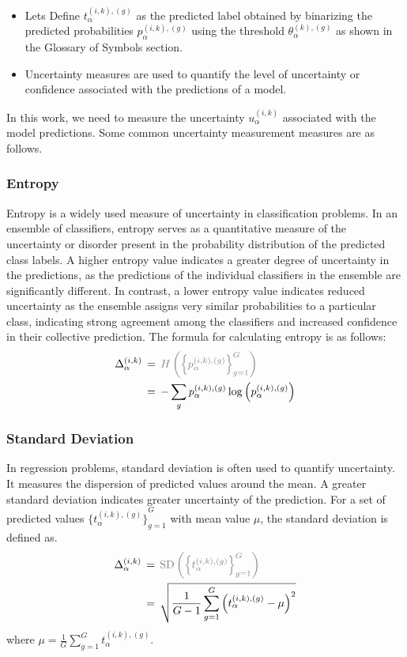 \documentclass[default]{bst/sn-jnl_mine}%
\begin{document}
\begin{itemize}
\begin{enumerate}
    \end{enumerate}
    \item Lets Define $t_{\alpha}^{(i,k),(g)} $ as the predicted label obtained by binarizing the predicted probabilities $p_{\alpha}^{ (i,k),(g)} $ using the threshold $\theta_{\alpha}^{(k),(g)} $ as shown in the Glossary of Symbols section.
    \item Uncertainty measures are used to quantify the level of uncertainty or confidence associated with the predictions of a model.
\end{itemize}
In this work, we need to measure the uncertainty $u_{\alpha}^{(i,k)}$ associated with the model predictions. Some common uncertainty measurement measures are as follows.
\subsubsection{Entropy}
Entropy is a widely used measure of uncertainty in classification problems. In an ensemble of classifiers, entropy serves as a quantitative measure of the uncertainty or disorder present in the probability distribution of the predicted class labels. A higher entropy value indicates a greater degree of uncertainty in the predictions, as the predictions of the individual classifiers in the ensemble are significantly different. In contrast, a lower entropy value indicates reduced uncertainty as the ensemble assigns very similar probabilities to a particular class, indicating strong agreement among the classifiers and increased confidence in their collective prediction. The formula for calculating entropy is as follows:
\begin{align}
    \Delta_{\alpha}^{(i,k)}
    \, & = \, \textcolor{gray}{H\left({\left\{p_{\alpha}^{(i,k),(g)}\right\}}_{g=1}^{G}\right)} \\
    \, & = \, -\sum_{g}{p_{\alpha}^{(i,k),(g)} \log\left(p_{\alpha}^{(i,k),(g)}\right)}
    \label{eq:crowd.Eq.5.uncertainty}
\end{align}
\subsubsection{Standard Deviation}
In regression problems, standard deviation is often used to quantify uncertainty. It measures the dispersion of predicted values around the mean. A greater standard deviation indicates greater uncertainty of the prediction. For a set of predicted values ${\{t_{\alpha}^{(i,k),(g)} \}}_{g=1}^G $ with mean value $\mu $, the standard deviation is defined as.
\begin{align}
\Delta_{\alpha}^{(i,k)}
\, & = \, \textcolor{gray}{\text{SD}\left({\left\{t_{\alpha}^{(i,k),(g)}\right\}}_{g=1}^G\right)} \\
\, & = \, \sqrt {\frac{1}{G-1}\sum_{g=1}^G {\left(t_{\alpha}^{(i,k),(g)}-\mu\right)}^2}
\label{eq:crowd.Eq.6.uncertainty.sd}
\end{align}
where $\mu=\frac{1}{G}\sum_{g=1}^{G}{t_{\alpha}^{(i,k),(g)}}$.
\end{document}
